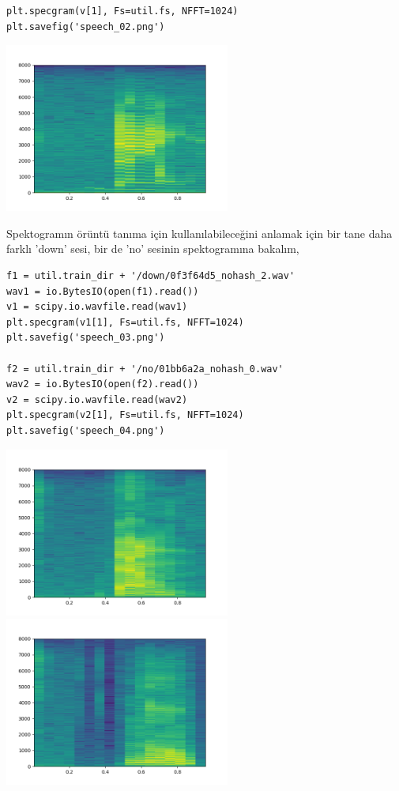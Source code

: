 \documentclass[12pt,fleqn]{article}\usepackage{../../common}
\begin{document}
\begin{verbatim}
plt.specgram(v[1], Fs=util.fs, NFFT=1024)
plt.savefig('speech_02.png')
\end{verbatim}

\includegraphics[width=20em]{speech_02.png}

Spektogramın örüntü tanıma için kullanılabileceğini anlamak için bir tane
daha farklı 'down' sesi, bir de 'no' sesinin spektogramına bakalım,

\begin{verbatim}
f1 = util.train_dir + '/down/0f3f64d5_nohash_2.wav'
wav1 = io.BytesIO(open(f1).read())
v1 = scipy.io.wavfile.read(wav1)
plt.specgram(v1[1], Fs=util.fs, NFFT=1024)
plt.savefig('speech_03.png')

f2 = util.train_dir + '/no/01bb6a2a_nohash_0.wav'
wav2 = io.BytesIO(open(f2).read())
v2 = scipy.io.wavfile.read(wav2)
plt.specgram(v2[1], Fs=util.fs, NFFT=1024)
plt.savefig('speech_04.png')
\end{verbatim}

\includegraphics[width=20em]{speech_03.png}
\includegraphics[width=20em]{speech_04.png}
\end{document}
